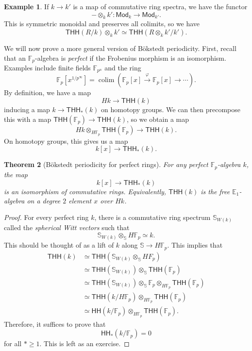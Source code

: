\documentclass[10pt, oneside]{memoir}
\newtheorem{thm}{Theorem}[subsection]
\theoremstyle{definition}
\newtheorem{exm}[thm]{Example}
\theoremstyle{remark}
\theoremstyle{plain}
\theoremstyle{definition}
\theoremstyle{remark}
\newcommand{\E}{\mathbb{E}}
\newcommand{\F}{\mathbb{F}}
\newcommand{\bS}{\mathbb{S}}
\newcommand{\ms}[1]{\mathsf{#1}}
\newcommand{\1}{\mathbf{1}}
\newcommand{\2}{\mathbf{2}}
\newcommand{\3}{\mathbf{3}}
\newcommand{\THH}{\ms{THH}}
\newcommand{\HH}{\ms{HH}}
\DeclareMathOperator*{\colim}{colim}
\begin{document}
\begin{exm}
    If \(k \to k' \) is a map of commutative ring spectra, we have the functor
    \[ - \otimes_k k' \colon \ms{Mod}_k \to \ms{Mod}_{k'}. \]
    This is symmetric monoidal and preserves all colimits, so we have
    \[ \THH(R/k) \otimes_k k' \simeq \THH(R \otimes_k k' / k'). \]
\end{exm}

We will now prove a more general version of B\"okstedt periodicity. First, recall that an \(\F_p \)-algebra is \textit{perfect} if the Frobenius morphism is an isomorphism. Examples include finite fields \(\F_{p^n} \) and the ring
\[ \F_p[x^{1/p^{\infty}}] = \colim (\F_p[x] \xrightarrow{\varphi} \F_p[x] \to \cdots). \]
By definition, we have a map
\[ Hk \to \THH(k) \]
inducing a map \(k \to \THH_*(k) \) on homotopy groups. We can then precompose this with a map \(\THH(\F_p) \to \THH(k) \), so we obtain a map
\[ Hk \otimes_{H \F_p} \THH(\F_p) \to \THH(k). \]
On homotopy groups, this gives us a map
\[ k[x] \to \THH_*(k). \]

\begin{thm}[B\"okstedt periodicity for perfect rings]
    For any perfect \(\F_p \)-algebra \(k \), the map
    \[ k[x] \to \THH_*(k) \]
    is an isomorphism of commutative rings. Equivalently, \(\THH(k) \) is the free \(\E_1 \)-algebra on a degree \(2 \) element \(x \) over \(Hk \).
\end{thm}

\begin{proof}
    For every perfect ring \(k \), there is a commutative ring spectrum \(\bS_{W(k)} \) called the \textit{spherical Witt vectors} such that
    \[ \bS_{W(k)} \otimes_{\bS} H \F_p \simeq k. \]
    This should be thought of as a lift of \(k \) along \(\bS \to H \F_p \). This implies that
    \begin{align*}
        \THH(k) &\simeq \THH(\bS_{W(k)}\otimes_{\bS} H F_p) \\
        &\simeq \THH(\bS_{W(k)}) \otimes_{\bS} \THH(\F_p) \\
        &\simeq \THH(\bS_{W(k)}) \otimes_{\bS} \F_p \otimes_{H\F_p} \THH(\F_p) \\
        &\simeq \THH(k/H\F_p) \otimes_{H \F_p} \THH(\F_p) \\
        &\simeq \HH(k/\F_p) \otimes_{H \F_p} \THH(\F_p).
    \end{align*}
    Therefore, it suffices to prove that
    \[ \HH_*(k/\F_p) = 0 \]
    for all \(* \geq 1 \). This is left as an exercise.
\end{proof}
\end{document}
